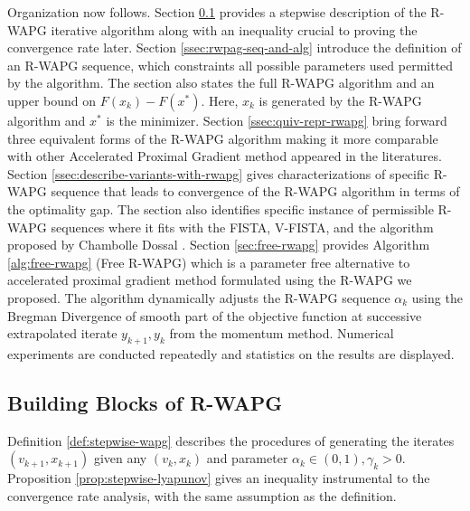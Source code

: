 \documentclass[12pt]{article}
\begin{document}
        Organization now follows. 
        Section \ref{ssec:building-block-rwapg} provides a stepwise description of the R-WAPG iterative algorithm along with an inequality crucial to proving the convergence rate later. 
        Section \ref{ssec:rwpag-seq-and-alg} introduce the definition of an R-WAPG sequence, which constraints all possible parameters used permitted by the algorithm.
        The section also states the full R-WAPG algorithm and an upper bound on $F(x_k) - F(x^*)$. 
        Here, $x_k$ is generated by the R-WAPG algorithm and $x^*$ is the minimizer. 
        Section \ref{ssec:quiv-repr-rwapg} bring forward three equivalent forms of the R-WAPG algorithm making it more comparable with other Accelerated Proximal Gradient method appeared in the literatures. 
        Section \ref{ssec:describe-variants-with-rwapg} gives characterizations of specific R-WAPG sequence that leads to convergence of the R-WAPG algorithm in terms of the optimality gap. 
        The section also identifies specific instance of permissible R-WAPG sequences where it fits with the FISTA, V-FISTA, and the algorithm proposed by Chambolle Dossal \cite{chambolle_convergence_2015}. 
        Section \ref{sec:free-rwapg} provides Algorithm \ref{alg:free-rwapg} (Free R-WAPG) which is a parameter free alternative to accelerated proximal gradient method formulated using the R-WAPG we proposed. 
        The algorithm dynamically adjusts the R-WAPG sequence $\alpha_k$ using the Bregman Divergence of smooth part of the objective function at successive extrapolated iterate $y_{k + 1}, y_k$ from the momentum method. 
        Numerical experiments are conducted repeatedly and statistics on the results are displayed. 

        
    \subsection{Building Blocks of R-WAPG}\label{ssec:building-block-rwapg}
        Definition \ref{def:stepwise-wapg} describes the procedures of generating the iterates $(v_{k + 1}, x_{k + 1})$ given any $(v_k, x_k)$ and parameter $\alpha_k \in (0, 1), \gamma_k > 0$. 
        Proposition \ref{prop:stepwise-lyapunov} gives an inequality instrumental to the convergence rate analysis, with the same assumption as the definition. 
\end{document}

